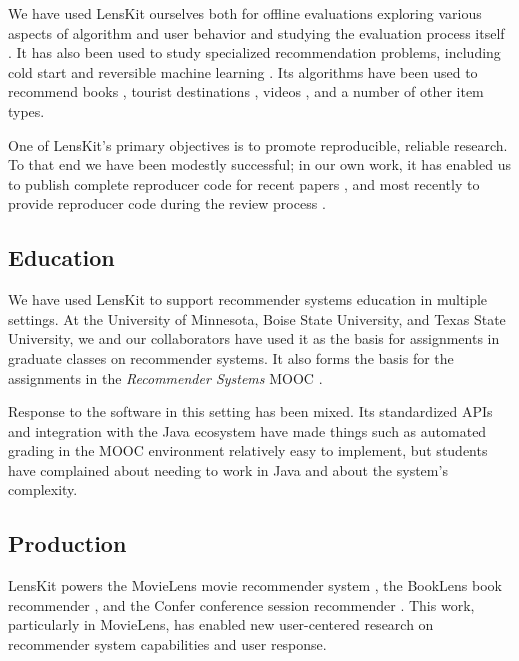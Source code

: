 We have used LensKit ourselves both for offline evaluations exploring various aspects of algorithm and user behavior \citep{Ekstrand2012-sk, Ekstrand2018-ip, Kluver2012-mf} and studying the evaluation process itself \citep{Ekstrand2017-zl}.
It has also been used to study specialized recommendation problems, including cold start \citep{Kluver2014-ha} and reversible machine learning \citep{Cao2015-jx}.
Its algorithms have been used to recommend books \citep{Pera2017-ip}, tourist destinations \citep{Pessemier2016-sp}, videos \citep{Solvang2017-zz}, and a number of other item types.

One of LensKit's primary objectives is to promote reproducible, reliable research.
To that end we have been modestly successful; in our own work, it has enabled us to publish complete reproducer code for recent papers \citep{Ekstrand2017-zl, Ekstrand2018-ip}, and most recently to provide reproducer code during the review process \citep{Ekstrand2018-um}.

\subsection{Education}

We have used LensKit to support recommender systems education in multiple settings.
At the University of Minnesota, Boise State University, and Texas State University, we and our collaborators have used it as the basis for assignments in graduate classes on recommender systems.
It also forms the basis for the assignments in the \emph{Recommender Systems} MOOC \citep{Konstan2015-mr}.

Response to the software in this setting has been mixed.
Its standardized APIs and integration with the Java ecosystem have made things such as automated grading in the MOOC environment relatively easy to implement, but students have complained about needing to work in Java and about the system's complexity.

\subsection{Production}

LensKit powers the MovieLens movie recommender system \citep{Harper2015-cx}, the BookLens book recommender \citep{Kluver2014-kh}, and the Confer conference session recommender \citep{Zhang:2016:CCR:2818052.2874340}.
This work, particularly in MovieLens, has enabled new user-centered research on recommender system capabilities and user response.

